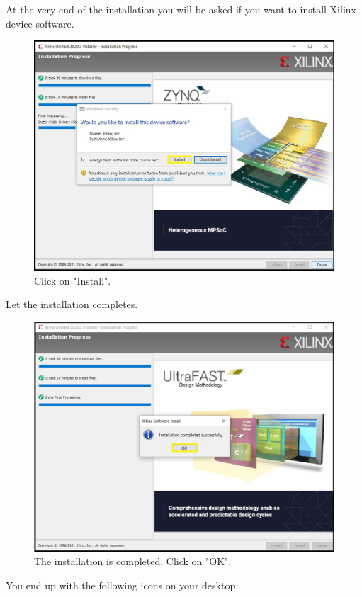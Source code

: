 At the very end of the installation you will be asked if you want to install Xilinx device software.

\begin{figure}[H]
\centering
  \includegraphics[width=0.8\linewidth]{images/VivadoInstimg018.jpg}
  \captionsetup{width=0.8\linewidth}
  \caption{Click on "Install".}
  \label{fig:VivadoInstimg018}
\end{figure}

Let the installation completes.

\begin{figure}[H]
\centering
  \includegraphics[width=0.8\linewidth]{images/VivadoInstimg019.jpg}
  \captionsetup{width=0.8\linewidth}
  \caption{The installation is completed. Click on "OK".}
  \label{fig:VivadoInstimg019}
\end{figure}

You end up with the following icons on your desktop:

